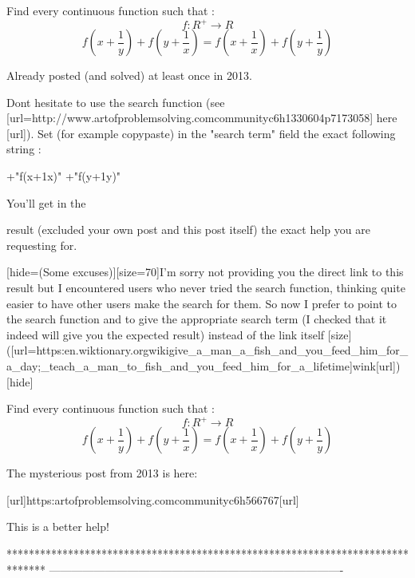 \begin{solution}
	\begin{tcolorbox}Find every continuous function such that :
\[f :R^{+}\rightarrow R\]
\[f(x+\frac{1}{y})+f(y+\frac{1}{x})=f(x+\frac{1}{x})+f(y+\frac{1}{y})\]\end{tcolorbox}
Already posted (and solved) at least once in 2013.

Dont hesitate to use the search function (see [url=http://www.artofproblemsolving.com\/community\/c6h1330604p7173058] here [\/url]).
Set (for example copy\/paste) in the "search term" field the exact following string : 

+"f(x+\frac 1x)" +"f(y+\frac 1y)"


You'll get in the result (excluded your own post and this post itself) the exact help you are requesting for.

[hide=(Some excuses)][size=70]I'm sorry not providing you the direct link to this result but I encountered users who never tried the search function, thinking quite easier to have other users make the search for them. So now I prefer to point to the search function and to give the appropriate search term (I checked that it indeed will give you the expected result) instead of the link itself [\/size]([url=https:\/\/en.wiktionary.org\/wiki\/give_a_man_a_fish_and_you_feed_him_for_a_day;_teach_a_man_to_fish_and_you_feed_him_for_a_lifetime]wink[\/url])[\/hide]







\end{solution}



\begin{solution}
	\begin{tcolorbox}Find every continuous function such that :
\[f :R^{+}\rightarrow R\]
\[f(x+\frac{1}{y})+f(y+\frac{1}{x})=f(x+\frac{1}{x})+f(y+\frac{1}{y})\]\end{tcolorbox}

\begin{bolded}The mysterious post from 2013 is here:\end{bolded}
[url]https:\/\/artofproblemsolving.com\/community\/c6h566767[\/url]
\begin{bolded}This is a better help!\end{bolded}
\end{solution}
*******************************************************************************
-------------------------------------------------------------------------------

